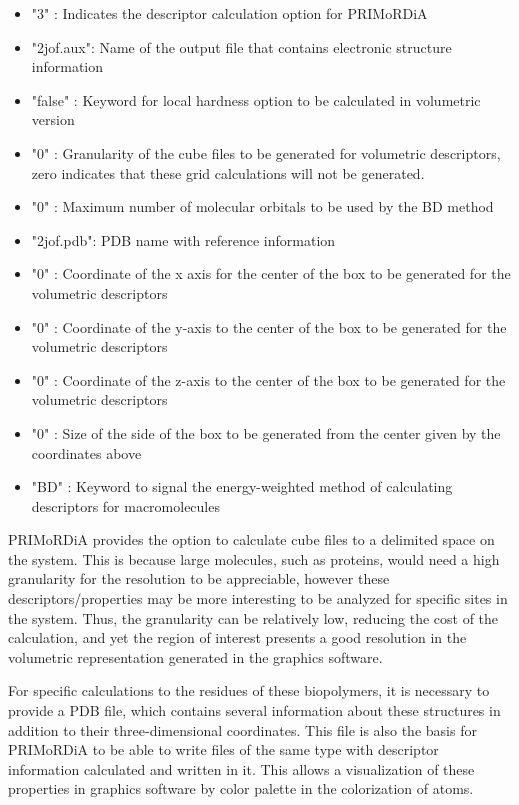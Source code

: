 \documentclass[a4paper,11pt]{refart}
\begin{document}
\begin{itemize}
	\item "3" : Indicates the descriptor calculation option for PRIMoRDiA
	\item "2jof.aux": Name of the output file that contains electronic structure information
	\item "false" : Keyword for local hardness option to be calculated in volumetric version
	\item "0" : Granularity of the cube files to be generated for volumetric descriptors, zero indicates that these grid calculations will not be generated.
	\item "0" : Maximum number of molecular orbitals to be used by the BD method
	\item "2jof.pdb": PDB name with reference information
	\item "0" : Coordinate of the x axis for the center of the box to be generated for the volumetric descriptors
	\item "0" : Coordinate of the y-axis to the center of the box to be generated for the volumetric descriptors
	\item "0" : Coordinate of the z-axis to the center of the box to be generated for the volumetric descriptors
	\item "0" : Size of the side of the box to be generated from the center given by the coordinates above
	\item "BD" : Keyword to signal the energy-weighted method of calculating descriptors for macromolecules
\end{itemize}

PRIMoRDiA provides the option to calculate cube files to a delimited space on the system. This is because large molecules, such as proteins, would need a high granularity for the resolution to be appreciable, however these descriptors/properties may be more interesting to be analyzed for specific sites in the system. Thus, the granularity can be relatively low, reducing the cost of the calculation, and yet the region of interest presents a good resolution in the volumetric representation generated in the graphics software.

For specific calculations to the residues of these biopolymers, it is necessary to provide a PDB file, which contains several information about these structures in addition to their three-dimensional coordinates. This file is also the basis for PRIMoRDiA to be able to write files of the same type with descriptor information calculated and written in it. This allows a visualization of these properties in graphics software by color palette in the colorization of atoms.
\end{document}
